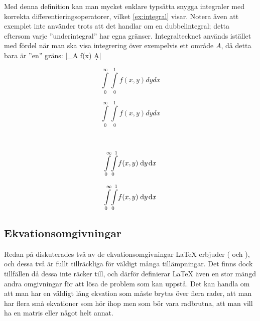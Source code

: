 \documentclass[lang=sv,ptsize=10pt,font=none,nomath,titles=bf,../../a4.tex]{subfiles}
\begin{document}
Med denna definition kan man mycket enklare typsätta snygga integraler med
korrekta differentieringsoperatorer, vilket \cref{ex:integral}
visar. Notera även att exemplet inte använder  trots att det
handlar om en dubbelintegral; detta eftersom varje ”underintegral” har
egna gränser. Integraltecknet  används istället med fördel när
man ska visa integrering över exempelvis ett område \(A\), då detta bara
är ”en” gräns:
\latex|\iint_A\! f(x) \d{A}|

\begin{kod}[tbp]
	\centering
			\begin{minipage}[b]{0.225\textwidth}
				\[ \int\limits_0^\infty\int\limits_0^1 f(x,y) dydx \]
			\end{minipage}
			\begin{minipage}{0.625\textwidth}
				\begin{latexcode}
\begin{equation*}
\int\limits_0^\infty
\int\limits_0^1 f(x,y) dydx
\end{equation*}
				\end{latexcode}
			\end{minipage}
	\\
			\begin{minipage}[b]{0.225\textwidth}
				\[ \int\limits_0^\infty\!\int\limits_0^1\! f(x,y) \d{y}\d{x} \]
			\end{minipage}
			\begin{minipage}{0.625\textwidth}
				\begin{latexcode}
\begin{equation*}
\int\limits_0^\infty\!
\int\limits_0^1\! f(x,y) \d{y}\d{x}
\end{equation*}
				\end{latexcode}
			\end{minipage}
	\caption[Integral med korrekt och inkorrekt typsättning]{Integral med
	korrekt (underst) och inkorrekt (överst) typsättning. Notera att 
	 inte finns i \LaTeX{} från början utan måste definieras med 
	den kod som presenteras på .}
	\label{ex:integral}
\end{kod}

\subsection{Ekvationsomgivningar}\label{sec:3:environments}
Redan på  diskuterades två av de 
ekvationsomgivningar
\AmS\LaTeX{} erbjuder ( och ), och dessa två
är fullt tillräckliga för väldigt många tillämpningar. Det finns dock
tillfällen då dessa inte räcker till, och därför definierar \AmS\LaTeX{}
även en stor mängd andra omgivningar för att lösa de problem som kan 
uppstå. Det kan handla om att man har en väldigt lång ekvation som måste
brytas över flera rader, att man har flera små ekvationer som hör ihop men
som bör vara radbrutna, att man vill ha en matris eller något helt annat.
\end{document}
